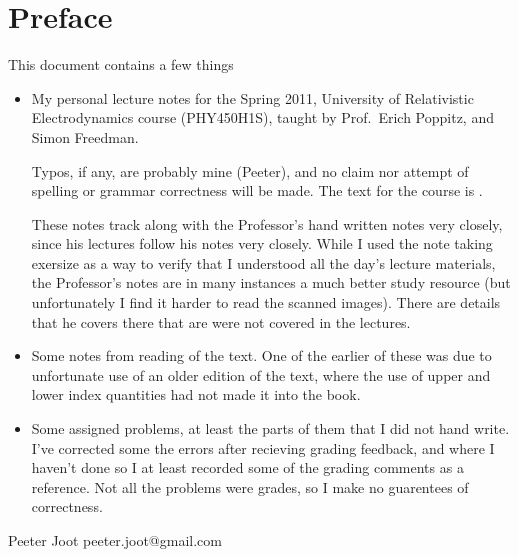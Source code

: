 \chapter*{Preface}\normalsize

This document contains a few things

\begin{itemize}
\item My personal lecture notes for the Spring 2011, University of Relativistic Electrodynamics course (PHY450H1S), taught by Prof.\ Erich Poppitz, and Simon Freedman.

Typos, if any, are probably mine (Peeter), and no claim nor attempt of spelling or grammar correctness will be made.  The text for the course is \cite{landau1980classical}.

These notes track along with the Professor's hand written notes very closely, since his lectures follow his notes very closely.  While I used the note taking exersize as a way to verify that I understood all the day's lecture materials, the Professor's notes are in many instances a much better study resource (but unfortunately I find it harder to read the scanned images).  There are details that he covers there that are were not covered in the lectures.

\item Some notes from reading of the text.  One of the earlier of these was due to unfortunate use of an older edition of the text, where the use of upper and lower index quantities had not made it into the book.

\item Some assigned problems, at least the parts of them that I did not hand write.  I've corrected some the errors after recieving grading feedback, and where I haven't done so I at least recorded some of the grading comments as a reference.  Not all the problems were grades, so I make no guarentees of correctness.

%
\end{itemize}

Peeter Joot  \quad peeter.joot@gmail.com 
